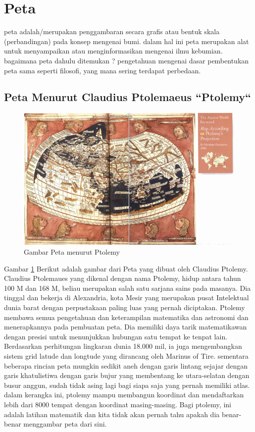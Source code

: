 
\section{Peta}
	peta adalah/merupakan penggambaran secara grafis atau bentuk skala (perbandingan) pada konsep mengenai bumi. dalam hal ini peta merupakan alat untuk menyampaikan atau menginformasikan mengenai ilmu kebumian. bagaimana peta dahulu ditemukan ? pengetahuan mengenai dasar pembentukan peta sama seperti filosofi, yang mana sering terdapat perbedaan.

\subsection{Peta Menurut Claudius Ptolemaeus ``Ptolemy``}
	\begin{figure} [ht]
	\centerline{\includegraphics[width=1\textwidth]{figures/PetaPtolemy.PNG}}
	\caption{Gambar Peta menurut Ptolemy}
	\label{PetaPtolemy}
	\end{figure}
	Gambar \ref {PetaPtolemy} Berikut adalah gambar dari Peta yang dibuat oleh Claudius Ptolemy.
	Claudius Ptolemaues yang dikenal dengan nama Ptolemy, hidup antara tahun 100 M dan 168 M, beliau merupakan salah satu sarjana sains pada masanya. Dia tinggal dan bekerja di Alexandria, kota Mesir yang merupakan pusat Intelektual dunia barat dengan perpustakaan paling luas yang pernah diciptakan. Ptolemy membawa semua pengetahuan dan keterampilan matematika dan astronomi dan menerapkannya pada pembuatan peta. Dia memiliki daya tarik matematikawan dengan presisi untuk menunjukkan hubungan satu tempat ke tenpat lain. Berdasarkan perhitungan lingkaran dunia 18.000 mil, ia juga mengembangkan sistem grid latude dan longtude yang dirancang oleh Marinus of Tire. sementara beberapa rincian peta mungkin sedikit aneh dengan garis lintang sejajar dengan garis khatulistiwa dengan garis bujur yang membentang ke utara-selatan dengan busur anggun, sudah tidak asing lagi bagi siapa saja yang pernah memiliki atlas. dalam kerangka ini, ptolemy mampu membangun koordinat dan mendaftarkan lebih dari 8000 tempat dengan koordinat masing-masing. Bagi ptolemy, ini adalah latihan matematik dan kita tidak akan pernah tahu apakah dia benar-benar menggambar peta dari sini.
